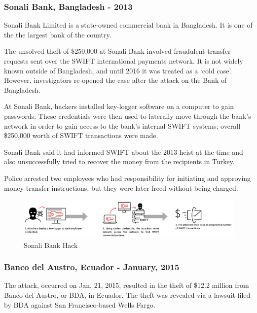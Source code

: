 \documentclass[12pt]{article}
\begin{document}
    \subsubsection{Sonali Bank, Bangladesh - 2013}
        Sonali Bank Limited is a state-owned commercial bank in Bangladesh. It is one of the the largest bank of the country.
        
        The unsolved theft of \$250,000 at Sonali Bank involved fraudulent transfer requests sent over the SWIFT international payments network. It is not widely known outside of Bangladesh, and until 2016 it was treated as a ‘cold case’. However, investigators re-opened the case after the attack on the Bank of Bangladesh. 
        
        At Sonali Bank, hackers installed key-logger software on a computer to gain passwords. These credentials were then used to laterally move through the bank’s network in order to gain access to the bank’s internal SWIFT systems; overall \$250,000 worth of SWIFT transactions were made.
        
        Sonali Bank said it had informed SWIFT about the 2013 heist at the time and also unsuccessfully tried to recover the money from the recipients in Turkey.
        
        Police arrested two employees who had responsibility for initiating and approving money transfer instructions, but they were later freed without being charged.\cite{sonali}
        
        \begin{figure}[H]
        \centering
        \includegraphics[width=\textwidth]{figures/sonali.png}
        \caption{Sonali Bank Hack}
        \label{fig:SonaliHacks}
        \end{figure}
        
    \subsubsection{Banco del Austro, Ecuador - January, 2015}
        The attack, occurred on Jan. 21, 2015, resulted in the theft of \$12.2 million from Banco del Austro, or BDA, in Ecuador. The theft was revealed via a lawsuit filed by BDA against San Francisco-based Wells Fargo. 
        
\end{document}
